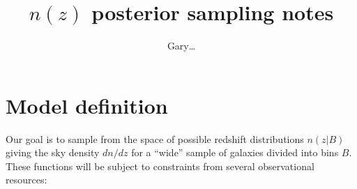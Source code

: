 \documentclass[11pt,preprint,flushrt]{aastex631}
\begin{document}

\title{$n(z)$ posterior sampling notes}

\author{Gary\ldots}


\section{Model definition}
Our goal is to sample from the space of possible redshift distributions $n(z | B)$ giving the sky
density $dn/dz$ for a ``wide'' sample of galaxies divided into bins
$B$.  These functions will be subject to constraints from several
observational resources:
\end{document}
